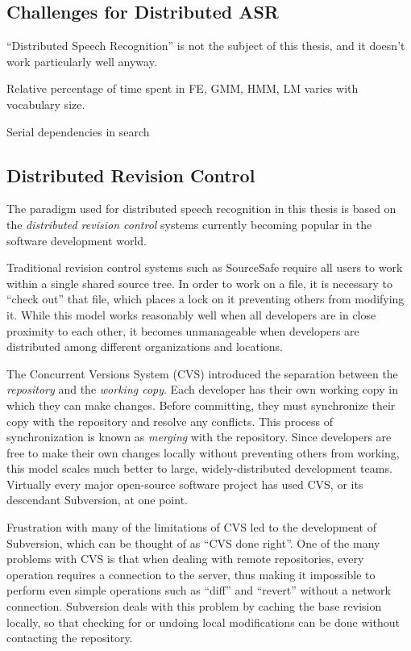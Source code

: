 \documentclass{article}
\begin{document}
\subsection{Challenges for Distributed ASR}
\label{sec:challenges}

``Distributed Speech Recognition'' is not the subject of this thesis,
and it doesn't work particularly well anyway.

Relative percentage of time spent in FE, GMM, HMM, LM varies with
vocabulary size.

Serial dependencies in search

\subsection{Distributed Revision Control}

The paradigm used for distributed speech recognition in this thesis is
based on the {\em distributed revision control} systems currently
becoming popular in the software development world.

Traditional revision control systems such as SourceSafe require all
users to work within a single shared source tree.  In order to work on
a file, it is necessary to ``check out'' that file, which places a
lock on it preventing others from modifying it.  While this model
works reasonably well when all developers are in close proximity to
each other, it becomes unmanageable when developers are distributed
among different organizations and locations.

The Concurrent Versions System (CVS) introduced the separation between
the {\em repository} and the {\em working copy}.  Each developer has
their own working copy in which they can make changes.  Before
committing, they must synchronize their copy with the repository and
resolve any conflicts.  This process of synchronization is known as
{\em merging} with the repository.  Since developers are free to make
their own changes locally without preventing others from working, this
model scales much better to large, widely-distributed development
teams.  Virtually every major open-source software project has used
CVS, or its descendant Subversion, at one point.

Frustration with many of the limitations of CVS led to the development
of Subversion, which can be thought of as ``CVS done right''.  One of
the many problems with CVS is that when dealing with remote
repositories, every operation requires a connection to the server,
thus making it impossible to perform even simple operations such as
``diff'' and ``revert'' without a network connection.  Subversion
deals with this problem by caching the base revision locally, so that
checking for or undoing local modifications can be done without
contacting the repository.
\end{document}
